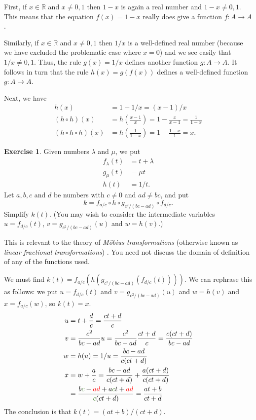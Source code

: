 \documentclass[a4paper]{book}
\newcommand{\RED}[1]{{\color{red}#1}}
\newcommand{\PURPLE}[1]{{\color{purple}#1}}
\newcommand{\OLIVEGREEN}[1]{{\color{olivegreen}#1}}
\newcommand{\R}         {{\mathbb{R}}}
\newcommand{\lm}        {\lambda}
\newcommand{\xra}       {\xrightarrow}
\renewcommand{\:}{\colon}
\newcommand{\mathworld}[1]{}
\newcommand{\DEFN}[1]{\PURPLE{\emph{#1}}}
\theoremstyle{definition}
\newtheorem{exercise}[theorem]{Exercise}
\renewenvironment{solution}{\SolutionInline}{\endSolutionInline}
\begin{document}
\begin{solution}
 First, if $x\in\R$ and $x\neq 0,1$ then $1-x$ is again a real number
 and $1-x\neq 0,1$.  This means that the equation $f(x)=1-x$ really
 does give a function $f\:A\xra{}A$.

 Similarly, if $x\in\R$ and $x\neq 0,1$ then $1/x$ is a well-defined
 real number (because we have excluded the problematic case where
 $x=0$) and we see easily that $1/x\neq 0,1$.  Thus, the rule
 $g(x)=1/x$ defines another function $g\:A\xra{}A$.  It follows in
 turn that the rule $h(x)=g(f(x))$ defines a well-defined function
 $g\:A\xra{}A$. 

 Next, we have
 \begin{align*}
  h(x)&= 1-1/x = (x-1)/x \\
  (h\circ h)(x) &= h(\frac{x-1}{x}) = 1 - \frac{x}{x-1} = \frac{1}{1-x} \\
  (h\circ h\circ h)(x) &= h\left(\frac{1}{1-x}\right) = 
                          1 - \frac{1-x}{1} = x.
 \end{align*}
\end{solution}
\begin{exercise}
 Given numbers $\lm$ and $\mu$, we put
 \begin{align*}
  f_\lm(t) &= t+\lm \\
  g_\mu(t) &= \mu t \\
  h(t)     &= 1/t.
 \end{align*}
 Let $a,b,c$ and $d$ be numbers with $c\neq 0$ and $ad\neq bc$, and
 put 
 \[ k = f_{a/c}\circ h \circ g_{c^2/(bc-ad)} \circ f_{d/c}. \]
 Simplify $k(t)$.  (You may wish to consider the intermediate
 variables $u=f_{d/c}(t)$, $v=g_{c^2/(bc-ad)}(u)$ and $w=h(v)$.)

 This is relevant to the theory of \DEFN{M\"obius transformations}
 (otherwise known as \DEFN{linear fractional transformations})
 \mathworld{LinearFractionalTransformation}.  You need not discuss the
 domain of definition of any of the functions used.
\end{exercise}
\begin{solution}
 We must find $k(t)=f_{a/c}(h(g_{c^2/(bc-ad)}(f_{d/c}(t))))$.  We can
 rephrase this as follows: we put $u=f_{d/c}(t)$ and
 $v=g_{c^2/(bc-ad)}(u)$ and $w=h(v)$ and $x=f_{a/c}(w)$, so $k(t)=x$.
 \begin{align*}
  u &= t+\frac{d}{c} = \frac{ct+d}{c} \\
  v &= \frac{c^2}{bc-ad}u = \frac{c^2}{bc-ad} \frac{ct+d}{c}
       = \frac{c(ct+d)}{bc-ad} \\
  w &= h(u) = 1/u = \frac{bc-ad}{c(ct+d)} \\
  x &= w + \frac{a}{c} =
       \frac{bc-ad}{c(ct+d)} + \frac{a(ct+d)}{c(ct+d)} \\
    &= \frac{b\OLIVEGREEN{c}-\RED{ad}+a\OLIVEGREEN{c}t+\RED{ad}}
            {\OLIVEGREEN{c}(ct+d)} = 
       \frac{at+b}{ct+d}
 \end{align*}
 The conclusion is that $k(t)=(at+b)/(ct+d)$.
\end{solution}
\end{document}
